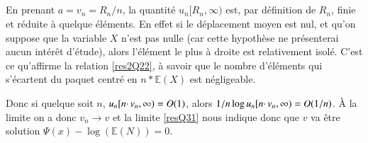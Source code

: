 \documentclass[12pt,titlepage=true]{article}
\newcommand{\esp}{\mathbb{E}}
\begin{document}
		\subsection{} %
			
			En prenant $a=v_n=R_n/n$, la quantité $u_n[R_n,\infty)$ est, par définition de $R_n$, finie et réduite à quelque éléments. En effet si le déplacement moyen est nul, et qu'on suppose que la variable $X$ n'est pas nulle (car cette hypothèse ne présenterai aucun intérêt d'étude), alors l'élément le plus à droite est relativement isolé. C'est ce qu'affirme la relation \ref{res2Q22}, à savoir que le nombre d'éléments qui s'écartent du paquet centré en $n*\esp(X)$ est négligeable.
			
			Donc si quelque soit $n$, $u_n[n\cdotp v_n,\infty)={\LARGE O}(1)$, alors $1/n \log u_n[n\cdotp v_n,\infty) = {\LARGE O}(1/n)$. À la limite on a donc $v_n\to v$ et la limite \ref{resQ31} nous indique donc que $v$ va être solution $\Psi(x)-\log(\esp(N))=0$.
			
		\subsection{} %
			
			
			
\end{document}
